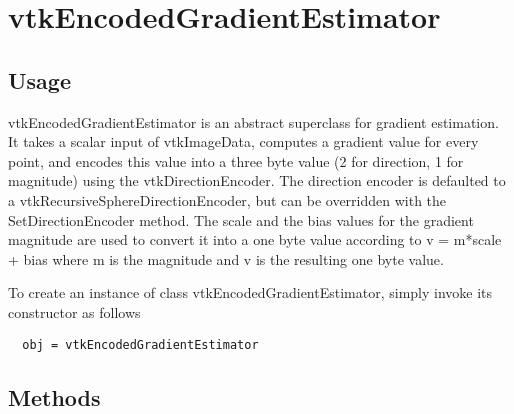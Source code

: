 \section{vtkEncodedGradientEstimator}

\subsection{Usage}

 vtkEncodedGradientEstimator is an abstract superclass for gradient 
 estimation. It takes a scalar input of vtkImageData, computes
 a gradient value for every point, and encodes this value into a 
 three byte value (2 for direction, 1 for magnitude) using the 
 vtkDirectionEncoder. The direction encoder is defaulted to a
 vtkRecursiveSphereDirectionEncoder, but can be overridden with the
 SetDirectionEncoder method. The scale and the bias values for the gradient
 magnitude are used to convert it into a one byte value according to
 v = m*scale + bias where m is the magnitude and v is the resulting
 one byte value.

To create an instance of class vtkEncodedGradientEstimator, simply
invoke its constructor as follows
\begin{verbatim}
  obj = vtkEncodedGradientEstimator
\end{verbatim}
\subsection{Methods}

